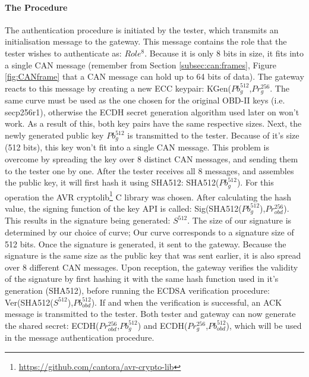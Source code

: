 \paragraph{The Procedure}

The authentication procedure is initiated by the tester, which transmits an initialisation message to the gateway. This message contains the role that the tester wishes to authenticate as: $Role^8$. Because it is only 8 bits in size, it fits into a single CAN message (remember from Section \ref{subsec:can:frames}, Figure \ref{fig:CANframe} that a CAN message can hold up to 64 bits of data). The gateway reacts to this message by creating a new ECC keypair: KGen($Pb_g^{512}$,$Pr_g^{256}$. The same curve must be used as the one chosen for the original OBD-II keys (i.e. secp256r1), otherwise the ECDH secret generation algorithm used later on won't work. As a result of this, both key pairs have the same respective sizes. Next, the newly generated public key $Pb_g^{512}$ is transmitted to the tester. Because of it's size (512 bits), this key won't fit into a single CAN message. This problem is overcome by spreading the key over 8 distinct CAN messages, and sending them to the tester one by one. After the tester receives all 8 messages, and assembles the public key, it will first hash it using SHA512: SHA512($Pb_g^{512}$). For this operation the AVR cryptolib\footnote{\url{https://github.com/cantora/avr-crypto-lib}} C library was chosen. After calculating the hash value, the signing function of the key API is called: Sig(SHA512($Pb_g^{512}$),$Pr_{obd}^{256}$). This results in the signature being generated: $S^{512}$. The size of our signature is determined by our choice of curve; Our curve corresponds to a signature size of 512 bits. Once the signature is generated, it sent to the gateway. Because the signature is the same size as the public key that was sent earlier, it is also spread over 8 different CAN messages. Upon reception, the gateway verifies the validity of the signature by first hashing it with the same hash function used in it's generation (SHA512), before running the ECDSA verification procedure: Ver(SHA512($S^{512}$),$Pb_{obd}^{512}$). If and when the verification is successful, an ACK message is transmitted to the tester. Both tester and gateway can now generate the shared secret: ECDH($Pr_{obd}^{256}$,$Pb_g^{512}$) and ECDH($Pr_g^{256}$,$Pb_{obd}^{512}$), which will be used in the message authentication procedure.

